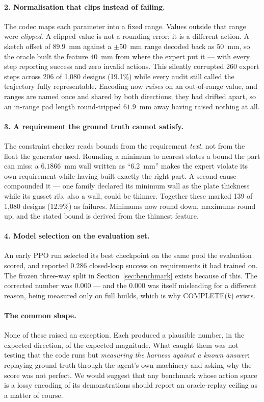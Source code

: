 \documentclass{article}
\begin{document}
\paragraph{2. Normalisation that clips instead of failing.}
The codec maps each parameter into a fixed range. Values outside that range were
\emph{clipped}. A clipped value is not a rounding error; it is a different
action. A sketch offset of $89.9$~mm against a $\pm 50$~mm range decoded back as
$50$~mm, so the oracle built the feature $40$~mm from where the expert put it ---
with every step reporting success and zero invalid actions. This silently
corrupted 260 expert steps across 206 of 1{,}080 designs (19.1\%) while every
audit still called the trajectory fully representable. Encoding now
\emph{raises} on an out-of-range value, and ranges are named once and shared by
both directions; they had drifted apart, so an in-range pad length round-tripped
$61.9$~mm away having raised nothing at all.

\paragraph{3. A requirement the ground truth cannot satisfy.}
The constraint checker reads bounds from the requirement \emph{text}, not from
the float the generator used. Rounding a minimum to nearest states a bound the
part can miss: a $6.1866$~mm wall written as ``6.2~mm'' makes the expert violate
its own requirement while having built exactly the right part. A second cause
compounded it --- one family declared its minimum wall as the plate thickness
while its gusset rib, also a wall, could be thinner. Together these marked 139 of
1{,}080 designs (12.9\%) as failures. Minimums now round down, maximums round up,
and the stated bound is derived from the thinnest feature.

\paragraph{4. Model selection on the evaluation set.}
An early PPO run selected its best checkpoint on the same pool the evaluation
scored, and reported $0.286$ closed-loop success on requirements it had trained
on. The frozen three-way split in Section~\ref{sec:benchmark} exists because of
this. The corrected number was $0.000$ --- and the $0.000$ was itself misleading
for a different reason, being measured only on full builds, which is why
COMPLETE($k$) exists.

\paragraph{The common shape.} None of these raised an exception. Each produced a
plausible number, in the expected direction, of the expected magnitude. What
caught them was not testing that the code runs but \emph{measuring the harness
against a known answer}: replaying ground truth through the agent's own
machinery and asking why the score was not perfect. We would suggest that any
benchmark whose action space is a lossy encoding of its demonstrations should
report an oracle-replay ceiling as a matter of course.
\end{document}
